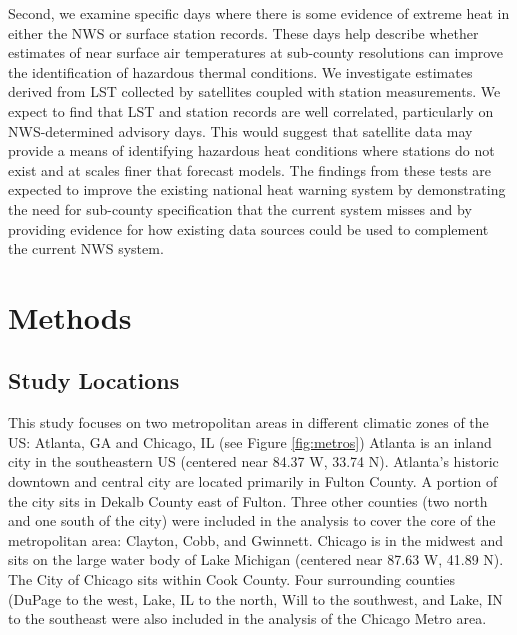 \documentclass{ametsoc}
\begin{document}
Second, we examine specific days where there is some evidence of extreme heat in either the NWS or surface station records. These days help describe whether estimates of near surface air temperatures at sub-county resolutions can improve the identification of hazardous thermal conditions. We investigate estimates derived from LST collected by satellites coupled with station measurements. We expect to find that LST and station records are well correlated, particularly on NWS-determined advisory days. This would suggest that satellite data may provide a means of identifying hazardous heat conditions where stations do not exist and at scales finer that forecast models. The findings from these tests are expected to improve the existing national heat warning system by demonstrating the need for sub-county specification that the current system misses and by providing evidence for how existing data sources could be used to complement the current NWS system. 


\section{Methods}\label{section:methods}
\subsection{Study Locations}\label{subsec:locations}
This study focuses on two metropolitan areas in different climatic zones of the US: Atlanta, GA and Chicago, IL (see Figure \ref{fig:metros}) Atlanta is an inland city in the southeastern US (centered near 84.37 W, 33.74 N). Atlanta's historic downtown and central city are located primarily in Fulton County. A portion of the city sits in Dekalb County east of Fulton. Three other counties (two north and one south of the city) were included in the analysis to cover the core of the metropolitan area: Clayton, Cobb, and Gwinnett. Chicago is in the midwest and sits on the large water body of Lake Michigan (centered near 87.63 W, 41.89 N).  The City of Chicago sits within Cook County. Four surrounding counties (DuPage to the west, Lake, IL to the north, Will to the southwest, and Lake, IN to the southeast were also included in the analysis of the Chicago Metro area. 
\end{document}
